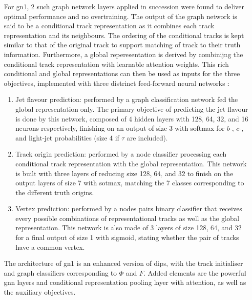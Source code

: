 For \gls{gn1}, 2 such graph network layers applied in succession were found to deliver optimal performance and no overtraining. The output of the graph network is said to be a conditional track representation as it combines each track representation and its neighbours. The ordering of the conditional tracks is kept similar to that of the original track to support matching of track to their truth information. Furthermore, a global reperesentation is derived by combinijng the conditional track representation with learnable attention weights. This rich conditional and global representations can then be used as inputs for the three objectives, implemented with three distrinct feed-forward neural networks \cite{ATL-PHYS-PUB-2022-027}:
\begin{enumerate}
  \item Jet flavour prediction: performed by a graph classification network fed the global representation only. The primary objective of predicting the jet flavour is done by this network, composed of 4 hidden layers with 128, 64, 32, and 16 neurons respectively, finishing on an output of size 3 with softmax for $b$-, $c$-, and light-jet probabilities (size 4 if $\tau$ are included).
  \item Track origin prediction: performed by a node classifier processing each conditional track representation with the global representation. This network is built with three layers of reducing size 128, 64, and 32 to finish on the output layers of size 7 with sotmax, matching the 7 classes corresponding to the different truth origins.
  \item Vertex prediction: performed by a nodes pairs binary classifier that receives every possible combinations of representational tracks as well as the global representation. This network is also made of 3 layers of size 128, 64, and 32 for a final output of size 1 with sigmoid, stating whether the pair of tracks have a common vertex. 
\end{enumerate}

The architecture of \gls{gn1} is an enhanced version of \gls{dips}, with the track initialiser and graph classifiers corresponding to $\Phi$ and $F$. Added elements are the powerful \gls{gnn} layers and conditional representation pooling layer with attention, as well as the auxiliary objectives. \\

